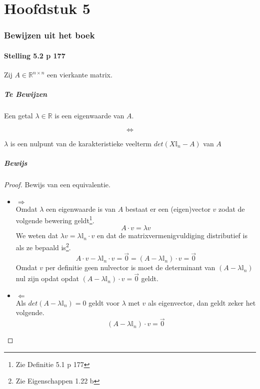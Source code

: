 \documentclass[lineaire_algebra_oplossingen.tex]{subfiles}
\begin{document}
\newpage
\part{Hoofdstuk 5}
\section{Bewijzen uit het boek}

\subsection{Stelling 5.2 p 177}
Zij $A\in \mathbb{R}^{n\times n}$ een vierkante matrix.
\subsubsection*{Te Bewijzen}
\begin{center}
Een getal $\lambda\in\mathbb{R}$ is een eigenwaarde van $A$.
\end{center}
\[\Leftrightarrow\]
\begin{center}
$\lambda$ is een nulpunt van de karakteristieke veelterm $det(X\mathbb{I}_n - A)$ van $A$
\end{center}
\subsubsection*{Bewijs}
\begin{proof}
Bewijs van een equivalentie.
\begin{itemize}
\item $\Rightarrow$\\
Omdat $\lambda$ een eigenwaarde is van $A$ bestaat er een (eigen)vector $v$ zodat de volgende bewering geldt\footnote{Zie Definitie 5.1 p 177}.
\[
A\cdot v = \lambda v
\]
We weten dat $\lambda v =  \lambda \mathbb{I}_n \cdot v$ en dat de matrixvermenigvuldiging distributief is als ze bepaald is\footnote{Zie Eigenschappen 1.22 b}.
\[
A\cdot v - \lambda \mathbb{I}_n \cdot v = \vec{0} = (A-\lambda\mathbb{I}_n)\cdot v = \vec{0}
\]
Omdat $v$ per definitie geen nulvector is moet de determinant van $(A-\lambda\mathbb{I}_n)$ nul zijn opdat opdat $(A-\lambda\mathbb{I}_n)\cdot v = \vec{0}$ geldt.

\item $\Leftarrow$\\
Als $det(A-\lambda\mathbb{I}_n) = 0$ geldt voor $\lambda$ met $v$ als eigenvector, dan geldt zeker het volgende.
\[
(A-\lambda\mathbb{I}_n)\cdot v = \vec{0}
\]
\end{itemize}
\end{proof}
\end{document}
